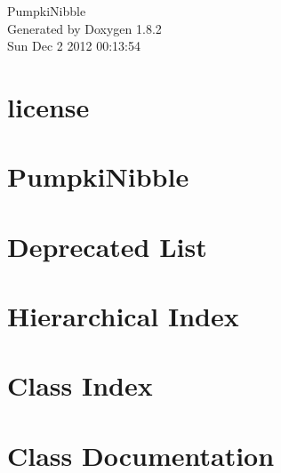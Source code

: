 \documentclass{book}
\begin{document}
\hypersetup{pageanchor=false,citecolor=blue}
\begin{titlepage}
\vspace*{7cm}
\begin{center}
{\Large Pumpki\-Nibble }\\
\vspace*{1cm}
{\large Generated by Doxygen 1.8.2}\\
\vspace*{0.5cm}
{\small Sun Dec 2 2012 00:13:54}\\
\end{center}
\end{titlepage}
\clearemptydoublepage
{}
\tableofcontents
\clearemptydoublepage
{}
\hypersetup{pageanchor=true,citecolor=blue}
\chapter{license}
\label{md_license}
\hypertarget{md_license}{}

\chapter{Pumpki\-Nibble}
\label{md_readme}
\hypertarget{md_readme}{}

\chapter{Deprecated List}
\label{deprecated}
\hypertarget{deprecated}{}

\chapter{Hierarchical Index}

\chapter{Class Index}

\chapter{Class Documentation}




\printindex
\end{document}

